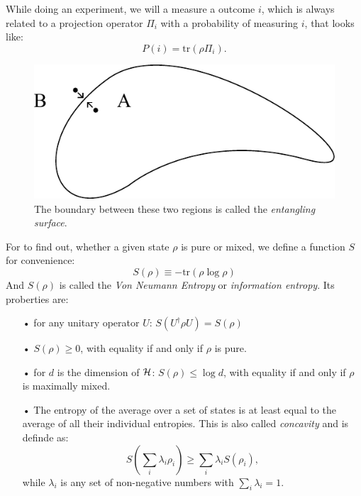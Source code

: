	 While doing an experiment, we will a measure a outcome $i$, which is always related to a projection operator $\Pi_i$ with a probability of measuring $i$, that looks like: 
		 \begin{equation}
	 		P(i)=\mathrm{tr}(\rho\Pi_i).
	 	\end{equation}
	 \begin{figure}[tbp]
	 	\begin{center}
	 		\includegraphics[scale=1]{entangledcorr}
	 		\caption{The boundary between these two regions is called the \textit{entangling surface}.}
	 	\end{center}
	 \end{figure}
	 For to find out, whether a given state $\rho$ is pure or mixed, we define a function $S$ for convenience:
		\begin{equation}
			S(\rho)\equiv -\mathrm{tr}(\rho \log \rho)
		\end{equation}	 	
	And $S(\rho)$ is called the \textit{Von Neumann Entropy} or \textit{information entropy}. 
	Its proberties are:
	\FloatBarrier
	\begin{itemize}
		\item[•] for any unitary operator $U$: $S(U^\dagger \rho U)=S(\rho)$
		\item[•] $S(\rho)\geq 0$, with equality if and only if $\rho$ is pure. 
		\item[•] for $d$ is the dimension of $\mathcal{H}$: $S(\rho)\leq \log d$, with equality if and only if $\rho$ is maximally mixed.
		\item[•] The entropy of the average over a set of states is at least equal to the average of all their individual entropies. This is also called \textit{concavity} and is definde as:
		\begin{equation}
			S \left(\sum_i \lambda_i \rho_i \right) \geq \sum_i \lambda_i S(\rho_i),
		\end{equation}
			while $\lambda_i$ is any set of non-negative numbers with $\sum_i \lambda_i =1$.
	\end{itemize}
